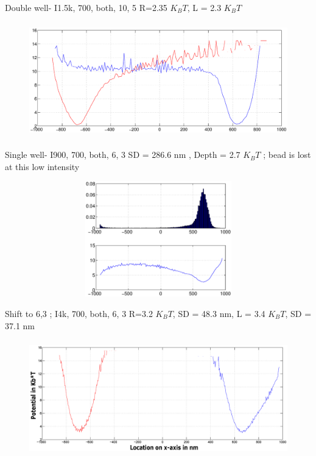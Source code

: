 \documentclass{beamer}
\begin{document}
\begin{frame}{Double well- I1.5k, 700, both, 10, 5} 
R=2.35 $K_BT$, L = 2.3 $K_BT$
\begin{figure}
    \centering
    \includegraphics[height=5cm,width=12cm]{both_wells_I1_5k_700_3and4.eps}
    \label{fig:graph11}
\end{figure}


\end{frame}
\begin{frame}{Single well- I900, 700, both, 6, 3} 
SD = 286.6 nm , Depth = 2.7 $K_BT$ ; bead is lost at this low intensity\\
\begin{figure}
    \centering
    \includegraphics[height=5cm,width=12cm]{right_well_I900_1.eps}
    \label{fig:graph12}
\end{figure}


\end{frame}

\begin{frame}{Shift to 6,3 ; I4k, 700, both, 6, 3} 
R=3.2 $K_BT$, SD = 48.3 nm, L = 3.4 $K_BT$, SD = 37.1 nm 
\begin{figure}
    \centering
    \includegraphics[height=5cm,width=12cm]{I4k_both_wells_700_1.eps}
    \label{fig:graph13}
\end{figure}


\end{frame}
\end{document}
